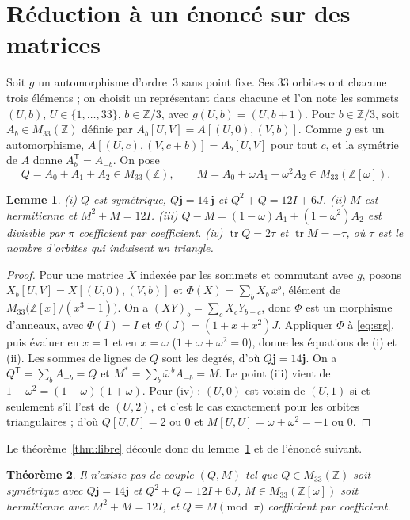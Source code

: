 \documentclass[11pt,a4paper]{article}
\newtheorem{theorem}{Théorème}
\newtheorem{lemma}[theorem]{Lemme}
\theoremstyle{remark}
\newcommand{\Z}{\mathbb{Z}}
\newcommand{\one}{\mathbf{j}}
\newcommand{\tr}{\operatorname{tr}}
\begin{document}
\section{Réduction à un énoncé sur des matrices}

Soit $g$ un automorphisme d'ordre~3 sans point fixe. Ses $33$ orbites ont chacune trois éléments ; on choisit un représentant dans
chacune et l'on note les sommets $(U,b)$, $U\in\{1,\dots,33\}$, $b\in\Z/3$, avec $g(U,b)=(U,b+1)$. Pour $b\in\Z/3$, soit
$A_b\in M_{33}(\Z)$ définie par $A_b[U,V]=A[(U,0),(V,b)]$. Comme $g$ est un automorphisme, $A[(U,c),(V,c+b)]=A_b[U,V]$ pour tout
$c$, et la symétrie de $A$ donne $A_b^{\mathsf T}=A_{-b}$. On pose
\[
Q=A_0+A_1+A_2\in M_{33}(\Z),\qquad M=A_0+\omega A_1+\omega^2A_2\in M_{33}(\Z[\omega]).
\]

\begin{lemma}\label{lem:QM}
(i) $Q$ est symétrique, $Q\one=14\,\one$ et $Q^2+Q=12I+6J$.
(ii) $M$ est hermitienne et $M^2+M=12I$.
(iii) $Q-M=(1-\omega)A_1+(1-\omega^2)A_2$ est divisible par $\pi$ coefficient par coefficient.
(iv) $\tr Q=2\tau$ et $\tr M=-\tau$, où $\tau$ est le nombre d'orbites qui induisent un triangle.
\end{lemma}
\begin{proof}
Pour une matrice $X$ indexée par les sommets et commutant avec $g$, posons $X_b[U,V]=X[(U,0),(V,b)]$ et
$\Phi(X)=\sum_b X_b\,x^b$, élément de $M_{33}\bigl(\Z[x]/(x^3-1)\bigr)$. On a ${(XY)_b=\sum_c X_cY_{b-c}}$, donc $\Phi$ est un
morphisme d'anneaux,
avec $\Phi(I)=I$ et $\Phi(J)=(1+x+x^2)J$. Appliquer $\Phi$ à \eqref{eq:srg}, puis évaluer en $x=1$ et en $x=\omega$
($1+\omega+\omega^2=0$), donne les équations de (i) et (ii). Les sommes de lignes de $Q$ sont les degrés, d'où $Q\one=14\one$.
On a $Q^{\mathsf T}=\sum_b A_{-b}=Q$ et $M^*=\sum_b\bar\omega^{\,b}A_{-b}=M$. Le point (iii) vient de $1-\omega^2=(1-\omega)(1+\omega)$.
Pour (iv) : $(U,0)$ est voisin de $(U,1)$ si et seulement s'il l'est de $(U,2)$, et c'est le cas exactement pour les orbites
triangulaires ; d'où $Q[U,U]=2$ ou $0$ et $M[U,U]=\omega+\omega^2=-1$ ou $0$.
\end{proof}

Le théorème~\ref{thm:libre} découle donc du lemme~\ref{lem:QM} et de l'énoncé suivant.

\begin{theorem}\label{thm:matrices}
Il n'existe pas de couple $(Q,M)$ tel que
$Q\in M_{33}(\Z)$ soit symétrique avec $Q\one=14\one$ et $Q^2+Q=12I+6J$, $M\in M_{33}(\Z[\omega])$ soit hermitienne avec $M^2+M=12I$,
et $Q\equiv M\pmod{\pi}$ coefficient par coefficient.
\end{theorem}
\end{document}
